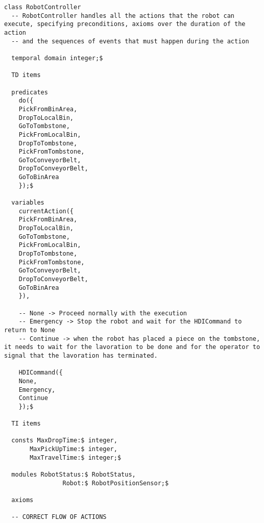 \begin{lstlisting}[fontadjust, mathescape, frame=tlb] 
class RobotController
  -- RobotController handles all the actions that the robot can execute, specifying preconditions, axioms over the duration of the action
  -- and the sequences of events that must happen during the action

  temporal domain integer;$

  TD items

  predicates
    do({
    PickFromBinArea,
    DropToLocalBin,
    GoToTombstone,
    PickFromLocalBin,
    DropToTombstone,
    PickFromTombstone,
    GoToConveyorBelt,
    DropToConveyorBelt,
    GoToBinArea
    });$

  variables
    currentAction({
    PickFromBinArea,
    DropToLocalBin,
    GoToTombstone,
    PickFromLocalBin,
    DropToTombstone,
    PickFromTombstone,
    GoToConveyorBelt,
    DropToConveyorBelt,
    GoToBinArea
    }),

    -- None -> Proceed normally with the execution
    -- Emergency -> Stop the robot and wait for the HDICommand to return to None
    -- Continue -> when the robot has placed a piece on the tombstone, it needs to wait for the lavoration to be done and for the operator to signal that the lavoration has terminated.

    HDICommand({
    None,
    Emergency,
    Continue
    });$
    
  TI items 
  
  consts MaxDropTime:$ integer,
       MaxPickUpTime:$ integer,
       MaxTravelTime:$ integer;$

  modules RobotStatus:$ RobotStatus,
                Robot:$ RobotPositionSensor;$

  axioms

  -- CORRECT FLOW OF ACTIONS


\end{lstlisting}
